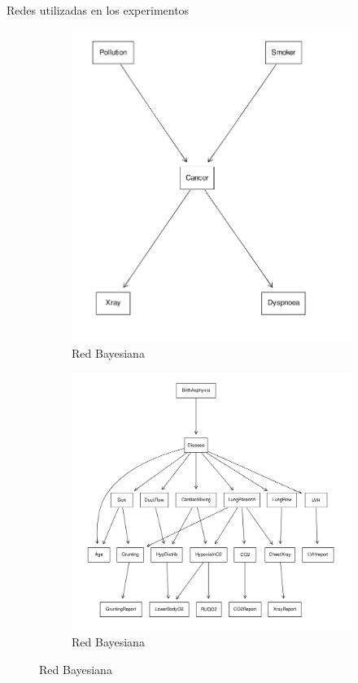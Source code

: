 \begin{frame}{Redes utilizadas en los experimentos}
\begin{figure}[ht]
		\begin{subfigure}[b]{0.3\textwidth}
			\centering
			\includegraphics[width=\textwidth]{pic/img/bayesianNetworks/cancerNetwork.png}
			\caption{Red Bayesiana \cancerNetwork}
			\label{fig:cancer_network}
		\end{subfigure}
		\hfill
		\begin{subfigure}[b]{0.6\textwidth}
			\centering
			\includegraphics[width=\textwidth]{pic/img/bayesianNetworks/childNetwork.png}
			\caption{Red Bayesiana  \childNetwork}
			\label{fig:child_network}
		\end{subfigure}
		

\end{figure}
\end{frame}
